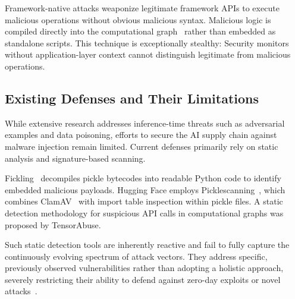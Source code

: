 
Framework-native attacks weaponize legitimate framework APIs to execute malicious operations without obvious malicious syntax\cite{zhu2025}. Malicious logic is compiled directly into the computational graph~\cite{langford2024architecturalneuralbackdoorsprinciples} rather than embedded as standalone scripts. This technique is exceptionally stealthy: Security monitors without application-layer context cannot distinguish legitimate from malicious operations.

\subsection{Existing Defenses and Their Limitations}

While extensive research addresses inference-time threats such as adversarial examples\cite{10656658, Xie_2025_CVPR} and data poisoning\cite{10646610, chen2025generalizabletargeteddatapoisoning}, efforts to secure the AI supply chain against malware injection remain limited\cite{nabeel2026deepdiveabusedl,jiang2026soktaxonomyattackvectors}. Current defenses primarily rely on static analysis and signature-based scanning.

Fickling~\cite{fickling} decompiles pickle bytecodes into readable Python code to identify embedded malicious payloads. Hugging Face employs Picklescanning~\cite{picklescanning}, which combines ClamAV~\cite{clamav} with import table inspection within pickle files. A static detection methodology for suspicious API calls in computational graphs was proposed by TensorAbuse\cite{zhu2025}.

Such static detection tools are inherently reactive and fail to fully capture the continuously evolving spectrum of attack vectors\cite{qian2025softwarevulnerabilityanalysisprogramming}. They address specific, previously observed vulnerabilities rather than adopting a holistic approach, severely restricting their ability to defend against zero-day exploits or novel attacks~\cite{tehrani2025llmvssasttechnical}.

